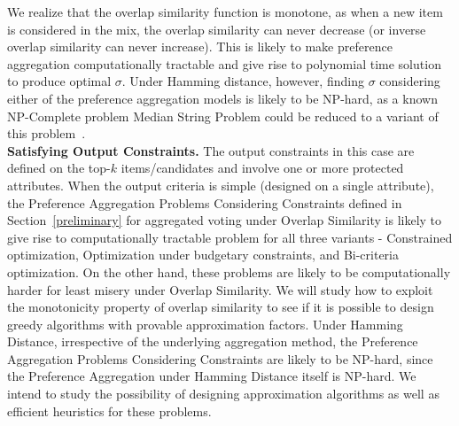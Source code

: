 \documentclass[11pt]{article}
\begin{document}
We realize that the overlap similarity function is monotone, as when a new item is considered in the mix, the overlap similarity can never decrease (or inverse overlap similarity can never increase). This is likely to make preference aggregation computationally tractable and give rise to polynomial time solution to produce optimal $\sigma$. Under Hamming distance, however, finding $\sigma$ considering either of the preference aggregation models is likely to be NP-hard, as a known NP-Complete problem Median String Problem could be reduced to a variant of this problem~\cite{de2000topology}. \\
{\bf Satisfying Output Constraints.}
The output constraints in this case are defined on the top-$k$ items/candidates and involve one or more protected attributes. When the output criteria is simple (designed on a single attribute),  the Preference Aggregation Problems Considering Constraints  defined in Section~\ref{preliminary} for aggregated voting under Overlap Similarity is likely to give rise to computationally tractable problem for all three variants - Constrained optimization, Optimization under budgetary constraints, and Bi-criteria optimization. On the other hand, these problems are likely to be computationally harder for least misery under Overlap Similarity. We will study how to exploit the monotonicity property of overlap similarity to see if it is possible to design greedy algorithms with provable approximation factors. Under Hamming Distance, irrespective of the underlying aggregation method, the Preference Aggregation Problems Considering Constraints are likely to be NP-hard, since the Preference Aggregation under Hamming Distance itself is NP-hard. We intend to study the possibility of designing approximation algorithms as well as efficient heuristics for these problems.
\end{document}

